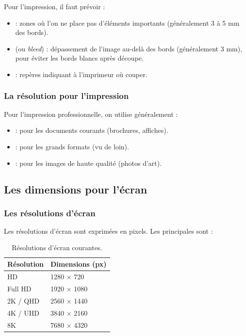 Pour l'impression, il faut prévoir :

\begin{itemize}
    \item {} : zones où l'on ne place pas d'éléments importants (généralement 3 à 5 mm des bords).
    \item {} (ou \emph{bleed}) : dépassement de l'image au-delà des bords (généralement 3 mm), pour éviter les bords blancs après découpe.
    \item {} : repères indiquant à l'imprimeur où couper.
\end{itemize}

\subsubsection{La résolution pour l'impression}

Pour l'impression professionnelle, on utilise généralement :

\begin{itemize}
    \item {} : pour les documents courants (brochures, affiches).
    \item {} : pour les grands formats (vu de loin).
    \item {} : pour les images de haute qualité (photos d'art).
\end{itemize}

\subsection{Les dimensions pour l'écran}

\subsubsection{Les résolutions d'écran}

Les résolutions d'écran sont exprimées en pixels. Les principales sont :

\begin{table}[h!]
\centering
\begin{tabular}{@{}ll@{}}
\toprule
\textbf{Résolution} & \textbf{Dimensions (px)} \\
\midrule
HD & 1280 × 720 \\
Full HD & 1920 × 1080 \\
2K / QHD & 2560 × 1440 \\
4K / UHD & 3840 × 2160 \\
8K & 7680 × 4320 \\
\bottomrule
\end{tabular}
\caption{Résolutions d'écran courantes.}
\end{table}

